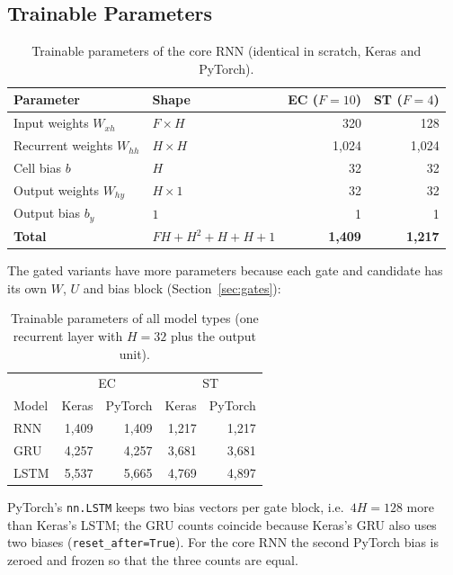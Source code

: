 \documentclass[11pt, a4paper]{article}
\begin{document}
\subsection{Trainable Parameters}

\begin{table}[H]
\centering
\caption{Trainable parameters of the core RNN (identical in scratch, Keras and PyTorch).}
\label{tab:params}
\small
\begin{tabular}{llrr}
\toprule
Parameter & Shape & EC ($F=10$) & ST ($F=4$) \\
\midrule
Input weights $W_{xh}$ & $F\times H$ & 320 & 128 \\
Recurrent weights $W_{hh}$ & $H\times H$ & 1{,}024 & 1{,}024 \\
Cell bias $b$ & $H$ & 32 & 32 \\
Output weights $W_{hy}$ & $H\times1$ & 32 & 32 \\
Output bias $b_y$ & $1$ & 1 & 1 \\
\midrule
\textbf{Total} & $FH+H^2+H+H+1$ & \textbf{1{,}409} & \textbf{1{,}217} \\
\bottomrule
\end{tabular}
\end{table}

The gated variants have more parameters because each gate and candidate has its own $W$, $U$ and bias block (Section~\ref{sec:gates}):

\begin{table}[H]
\centering
\caption{Trainable parameters of all model types (one recurrent layer with $H=32$ plus the output unit).}
\label{tab:params-all}
\small
\begin{tabular}{lrrrr}
\toprule
 & \multicolumn{2}{c}{EC} & \multicolumn{2}{c}{ST} \\
Model & Keras & PyTorch & Keras & PyTorch \\
\midrule
RNN & 1{,}409 & 1{,}409 & 1{,}217 & 1{,}217 \\
GRU & 4{,}257 & 4{,}257 & 3{,}681 & 3{,}681 \\
LSTM & 5{,}537 & 5{,}665 & 4{,}769 & 4{,}897 \\
\bottomrule
\end{tabular}
\end{table}

PyTorch's \texttt{nn.LSTM} keeps two bias vectors per gate block, i.e.\ $4H=128$ more than Keras's LSTM; the GRU counts coincide because Keras's GRU also uses two biases (\texttt{reset\_after=True}).
For the core RNN the second PyTorch bias is zeroed and frozen so that the three counts are equal.
\end{document}
